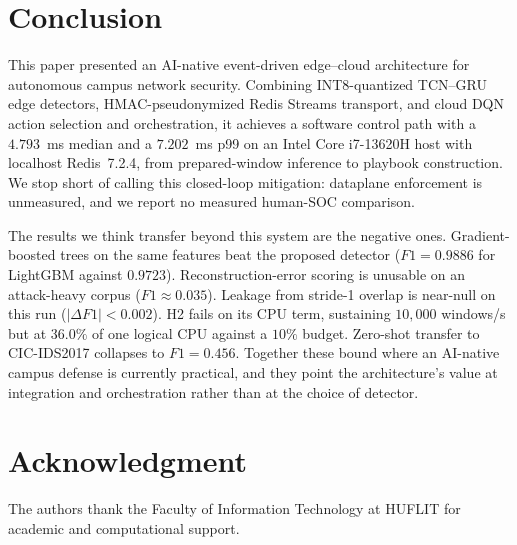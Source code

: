 \documentclass[conference,a4paper]{IEEEtran}
\begin{document}
\section{Conclusion}
This paper presented an AI-native event-driven edge--cloud architecture for autonomous campus network security. Combining INT8-quantized TCN--GRU edge detectors, HMAC-pseudonymized Redis Streams transport, and cloud DQN action selection and orchestration, it achieves a software control path with a $4.793$~ms median and a $7.202$~ms p99 on an Intel Core i7-13620H host with localhost Redis~7.2.4, from prepared-window inference to playbook construction. We stop short of calling this closed-loop mitigation: dataplane enforcement is unmeasured, and we report no measured human-SOC comparison.

The results we think transfer beyond this system are the negative ones. Gradient-boosted trees on the same features beat the proposed detector ($F1 = 0.9886$ for LightGBM against $0.9723$). Reconstruction-error scoring is unusable on an attack-heavy corpus ($F1 \approx 0.035$). Leakage from stride-1 overlap is near-null on this run ($|\Delta F1| < 0.002$). H2 fails on its CPU term, sustaining $10{,}000$ windows/s but at $36.0\%$ of one logical CPU against a $10\%$ budget. Zero-shot transfer to CIC-IDS2017 collapses to $F1 = 0.456$. Together these bound where an AI-native campus defense is currently practical, and they point the architecture's value at integration and orchestration rather than at the choice of detector.

\section*{Acknowledgment}
The authors thank the Faculty of Information Technology at HUFLIT for academic and computational support.
\end{document}
